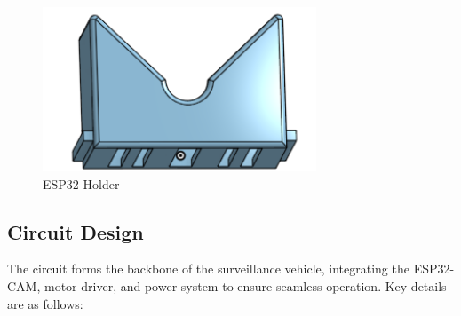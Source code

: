 \documentclass[12pt,a4paper]{report}
\begin{document}
\begin{enumerate}
\begin{figure}[H]
    \begin{minipage}{0.3\textwidth}
        \centering
        \includegraphics[width=\textwidth]{espHolder}  %
        \caption{ESP32 Holder}
        \label{fig:espHolder}
    \end{minipage}
\end{figure}    
    
    
\end{enumerate}






\subsection{Circuit Design}

The circuit forms the backbone of the surveillance vehicle, integrating the ESP32-CAM, motor driver, and power system to ensure seamless operation. Key details are as follows:
\end{document}
